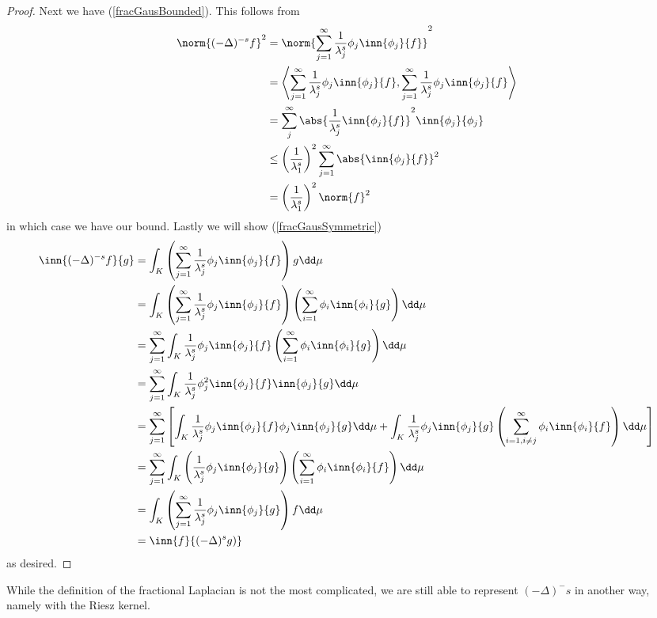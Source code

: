 \begin{proof}
	Next we have (\ref{fracGausBounded}). This follows from
	\begin{align}
		\norm{(-\Delta)^{-s}f}^2 &= \norm{\sum_{j = 1}^{\infty} \frac{1}{\lambda_{j}^{s}} \phi_j \inn{\phi_j}{f}}^2 \\
			&= \left\langle \sum_{j = 1}^{\infty} \frac{1}{\lambda_{j}^{s}} \phi_j \inn{\phi_j}{f},\sum_{j = 1}^{\infty} \frac{1}{\lambda_{j}^{s}} \phi_j \inn{\phi_j}{f} \right\rangle \\
			&= \sum_{j}^{\infty} \abs{\frac{1}{\lambda_j^s} \inn{\phi_j}{f}}^2\inn{\phi_j}{\phi_j} \\
			&\leq \left(\frac{1}{\lambda_1^s}\right)^2 \sum_{j=1}^{\infty} \abs{\inn{\phi_j}{f}}^2 \\
			&= \left(\frac{1}{\lambda_1^s}\right)^2 \norm{f}^2
	\end{align}
	in which case we have our bound. Lastly we will show (\ref{fracGausSymmetric})
	\begin{align}
		\inn{(-\Delta)^{-s}f}{g} &= \int_{K} \left(\sum_{j = 1}^{\infty} \frac{1}{\lambda_{j}^{s}} \phi_j \inn{\phi_j}{f} \right) g \dd \mu \\
		&=\int_{K} \left(\sum_{j = 1}^{\infty} \frac{1}{\lambda_{j}^{s}} \phi_j \inn{\phi_j}{f} \right) \left(\sum_{i = 1}^{\infty} \phi_i \inn{\phi_i}{g}\right) \dd \mu \\
		&= \sum_{j = 1}^{\infty} \int_{K} \frac{1}{\lambda_j^s}\phi_j \inn{\phi_j}{f}\left(\sum_{i = 1}^{\infty} \phi_i \inn{\phi_i}{g}\right) \dd \mu \\
		&= \sum_{j =1}^{\infty} \int_{K} \frac{1}{\lambda_j^{s}} \phi_j^2 \inn{\phi_j}{f}\inn{\phi_j}{g} \dd \mu \\
		&= \sum_{j = 1}^{\infty} \left[\int_{K} \frac{1}{\lambda_j^{s}} \phi_j \inn{\phi_j}{f} \phi_j\inn{\phi_j}{g} \dd \mu + \int_{K}\frac{1}{\lambda_j^{s}}\phi_j\inn{\phi_j}{g} \left(\sum_{i = 1, i \neq j}^{\infty} \phi_i \inn{\phi_i}{f}\right) \dd \mu\right] \\
		&= \sum_{j=1}^{\infty} \int_{K}\left(\frac{1}{\lambda_j^{s}}\phi_j\inn{\phi_j}{g}\right)\left(\sum_{i = 1}^{\infty} \phi_i \inn{\phi_i}{f}\right) \dd \mu \\
		& = \int_{K} \left(\sum_{j = 1}^{\infty} \frac{1}{\lambda_j^s} \phi_j \inn{\phi_j}{g}\right) f \dd \mu \\
		&= \inn{f}{(-\Delta)^sg)}
	\end{align}
	as desired.
\end{proof}
While the definition of the fractional Laplacian is not the most complicated, we are still able to represent $(-\Delta)^-s$ in another way, namely with the Riesz kernel.
